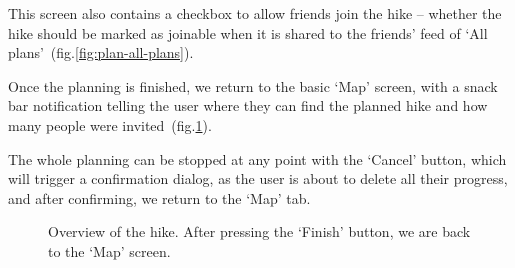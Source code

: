 This screen also contains a checkbox to allow friends join the hike -- whether the hike should be marked as joinable when it is shared to the friends' feed of `All plans'~(fig.\ref{fig:plan-all-plans}).

Once the planning is finished, we return to the basic `Map' screen, with a snack bar notification telling the user where they can find the planned hike and how many people were invited~(fig.\ref{fig:plan-end}).

The whole planning can be stopped at any point with the `Cancel' button, which will trigger a confirmation dialog, as the user is about to delete all their progress, and after confirming, we return to the `Map' tab.

\begin{figure}[h!]
    \centering
    \hfill
    \hfill
    \caption{Overview of the hike. After pressing the `Finish' button, we are back to the `Map' screen.}
    \label{fig:plan-end}
\end{figure}

